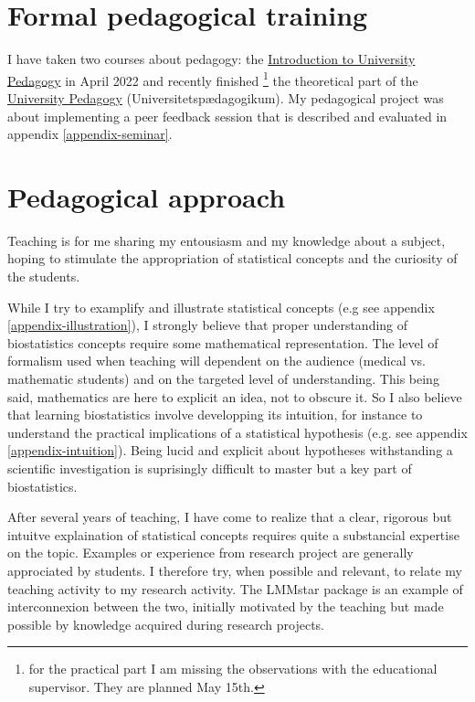 \documentclass[12pt]{article}
\begin{document}
\clearpage


\section{Formal pedagogical training}
\label{sec:org9891d48}

I have taken two courses about pedagogy: the \href{https://absalon.ku.dk/courses/58829}{Introduction to
University Pedagogy} in April 2022 and recently finished \footnote{for the
practical part I am missing the observations with the educational
supervisor. They are planned May 15th.} the theoretical part of the
\href{https://absalon.ku.dk/courses/58114}{University Pedagogy} (Universitetspædagogikum). My pedagogical project
was about implementing a peer feedback session that is described and
evaluated in appendix \ref{appendix-seminar}.

\section{Pedagogical approach}
\label{sec:orgb8a3d5d}

Teaching is for me sharing my entousiasm and my knowledge about a
subject, hoping to stimulate the appropriation of statistical concepts
and the curiosity of the students.

\bigskip

While I try to examplify and illustrate statistical concepts (e.g see
appendix \ref{appendix-illustration}), I strongly believe that proper
understanding of biostatistics concepts require some mathematical
representation. The level of formalism used when teaching will
dependent on the audience (medical vs. mathematic students) and on the
targeted level of understanding. This being said, mathematics are here
to explicit an idea, not to obscure it. So I also believe that
learning biostatistics involve developping its intuition, for instance
to understand the practical implications of a statistical hypothesis
(e.g. see appendix \ref{appendix-intuition}). Being lucid and explicit
about hypotheses withstanding a scientific investigation is
suprisingly difficult to master but a key part of biostatistics.

\bigskip

After several years of teaching, I have come to realize that a clear,
rigorous but intuitve explaination of statistical concepts requires
quite a substancial expertise on the topic. Examples or experience
from research project are generally approciated by students. I
therefore try, when possible and relevant, to relate my teaching
activity to my research activity. The LMMstar package is an example of
interconnexion between the two, initially motivated by the teaching
but made possible by knowledge acquired during research projects.
\end{document}
